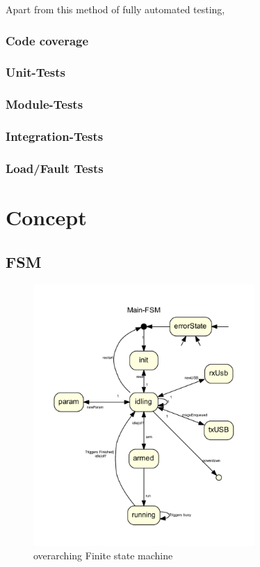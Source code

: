 \documentclass[master,english,smartquotes,apa]{hgbthesis}
\begin{document}
			
			
			
			Apart from this method of fully automated testing, 
			
			\subsection{Code coverage}
			
			\subsection{Unit-Tests}
			\subsection{Module-Tests}
			\subsection{Integration-Tests}
			\subsection{Load/Fault Tests}

	\chapter{Concept}
	\label{cha:Concept}
		\section{FSM}

		\begin{figure}[H]
			\center
			\includegraphics[width=0.75\textwidth]{src/_mainFSM_neato.pdf}
			\caption{overarching Finite state machine}
			\label{fig:FSM}
		\end{figure}
\end{document}
